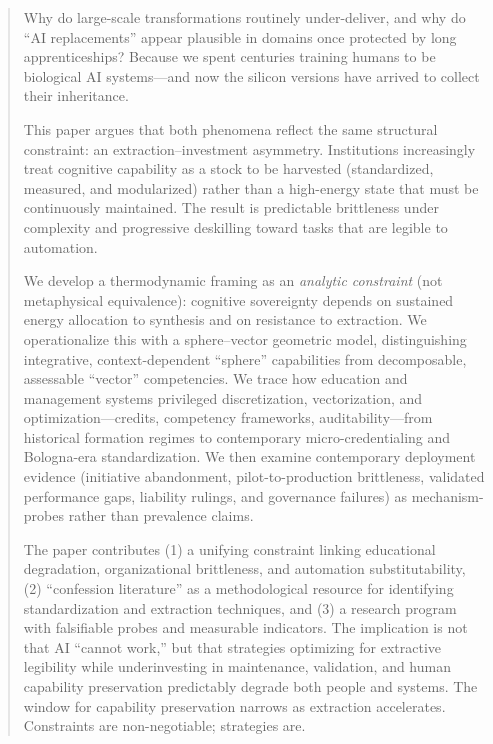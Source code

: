 \begin{abstract}
Why do large-scale transformations routinely under-deliver, and why do 
``AI replacements'' appear plausible in domains once protected by long 
apprenticeships? Because we spent centuries training humans to be 
biological AI systems—and now the silicon versions have arrived to 
collect their inheritance.

This paper argues that both phenomena reflect the same structural 
constraint: an extraction--investment asymmetry. Institutions 
increasingly treat cognitive capability as a stock to be harvested 
(standardized, measured, and modularized) rather than a high-energy 
state that must be continuously maintained. The result is predictable 
brittleness under complexity and progressive deskilling toward tasks 
that are legible to automation.

We develop a thermodynamic framing as an \textit{analytic constraint} 
(not metaphysical equivalence): cognitive sovereignty depends on 
sustained energy allocation to synthesis and on resistance to 
extraction. We operationalize this with a sphere--vector geometric 
model, distinguishing integrative, context-dependent ``sphere'' 
capabilities from decomposable, assessable ``vector'' competencies. 
We trace how education and management systems privileged 
discretization, vectorization, and optimization—credits, competency 
frameworks, auditability—from historical formation regimes to 
contemporary micro-credentialing and Bologna-era standardization. We 
then examine contemporary deployment evidence (initiative abandonment, 
pilot-to-production brittleness, validated performance gaps, liability 
rulings, and governance failures) as mechanism-probes rather than 
prevalence claims.

The paper contributes (1) a unifying constraint linking educational 
degradation, organizational brittleness, and automation 
substitutability, (2) ``confession literature'' as a methodological 
resource for identifying standardization and extraction techniques, 
and (3) a research program with falsifiable probes and measurable 
indicators. The implication is not that AI ``cannot work,'' but that 
strategies optimizing for extractive legibility while underinvesting 
in maintenance, validation, and human capability preservation 
predictably degrade both people and systems. The window for capability 
preservation narrows as extraction accelerates. Constraints are 
non-negotiable; strategies are.
\end{abstract}
